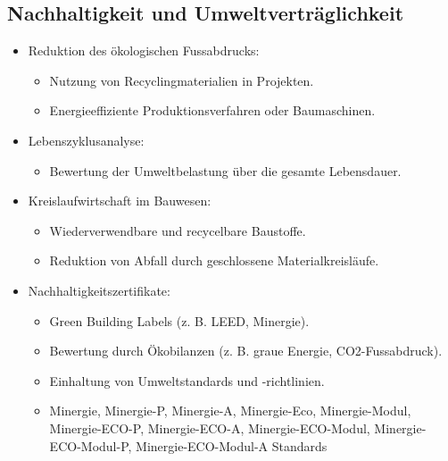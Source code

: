 \documentclass[
11pt,
captions=tableheading,
smallheadings,
headsepline,
footsepline, 
captions=tableheading,
parskip=half-,
]{scrartcl}
\begin{document}
\subsection{Nachhaltigkeit und Umweltverträglichkeit}
\begin{itemize}
    \item Reduktion des ökologischen Fussabdrucks:
    \begin{itemize}
        \item Nutzung von Recyclingmaterialien in Projekten.
        \item Energieeffiziente Produktionsverfahren oder Baumaschinen.
    \end{itemize}
    \item Lebenszyklusanalyse:
    \begin{itemize}
        \item Bewertung der Umweltbelastung über die gesamte Lebensdauer.
    \end{itemize}
    \item Kreislaufwirtschaft im Bauwesen:
    \begin{itemize}
        \item Wiederverwendbare und recycelbare Baustoffe.
        \item Reduktion von Abfall durch geschlossene Materialkreisläufe.
    \end{itemize}
    \item Nachhaltigkeitszertifikate:
    \begin{itemize}
        \item Green Building Labels (z. B. LEED, Minergie).
        \item Bewertung durch Ökobilanzen (z. B. graue Energie, CO2-Fussabdruck).
        \item Einhaltung von Umweltstandards und -richtlinien.
        \item Minergie, Minergie-P, Minergie-A, Minergie-Eco, Minergie-Modul, Minergie-ECO-P, Minergie-ECO-A, Minergie-ECO-Modul, Minergie-ECO-Modul-P, Minergie-ECO-Modul-A Standards
    \end{itemize}
\end{itemize}
\end{document}
